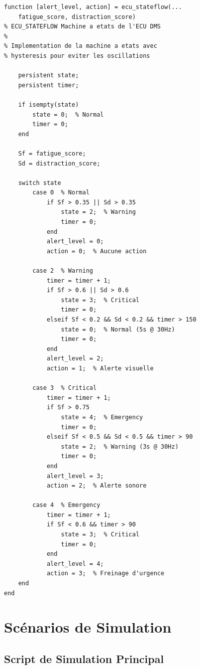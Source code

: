 \begin{lstlisting}[style=matlabstyle, caption={Logique de la machine à états ECU en MATLAB.}, label={lst:stateflow_matlab}]
function [alert_level, action] = ecu_stateflow(...
    fatigue_score, distraction_score)
% ECU_STATEFLOW Machine a etats de l'ECU DMS
%
% Implementation de la machine a etats avec
% hysteresis pour eviter les oscillations

    persistent state;
    persistent timer;
    
    if isempty(state)
        state = 0;  % Normal
        timer = 0;
    end
    
    Sf = fatigue_score;
    Sd = distraction_score;
    
    switch state
        case 0  % Normal
            if Sf > 0.35 || Sd > 0.35
                state = 2;  % Warning
                timer = 0;
            end
            alert_level = 0;
            action = 0;  % Aucune action
            
        case 2  % Warning
            timer = timer + 1;
            if Sf > 0.6 || Sd > 0.6
                state = 3;  % Critical
                timer = 0;
            elseif Sf < 0.2 && Sd < 0.2 && timer > 150
                state = 0;  % Normal (5s @ 30Hz)
                timer = 0;
            end
            alert_level = 2;
            action = 1;  % Alerte visuelle
            
        case 3  % Critical
            timer = timer + 1;
            if Sf > 0.75
                state = 4;  % Emergency
                timer = 0;
            elseif Sf < 0.5 && Sd < 0.5 && timer > 90
                state = 2;  % Warning (3s @ 30Hz)
                timer = 0;
            end
            alert_level = 3;
            action = 2;  % Alerte sonore
            
        case 4  % Emergency
            timer = timer + 1;
            if Sf < 0.6 && timer > 90
                state = 3;  % Critical
                timer = 0;
            end
            alert_level = 4;
            action = 3;  % Freinage d'urgence
    end
end
\end{lstlisting}

\section{Scénarios de Simulation}

\subsection{Script de Simulation Principal}

